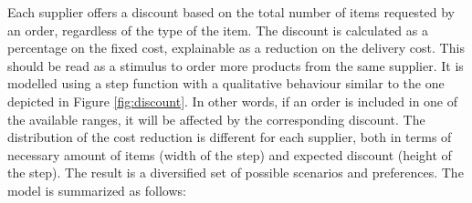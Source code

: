 \documentclass{article}
\begin{document}
Each supplier offers a discount based on the total number of items requested by an order, regardless of the type of the item. The discount is calculated as a percentage on the fixed cost, explainable as a reduction on the delivery cost. This should be read as a stimulus to order more products from the same supplier. It is modelled using a step function with a qualitative behaviour similar to the one depicted in Figure \ref{fig:discount}. In other words, if an order is included in one of the available ranges, it will be affected by the corresponding discount. The distribution of the cost reduction is different for each supplier, both in terms of necessary amount of items (width of the step) and expected discount (height of the step). The result is a diversified set of possible scenarios and preferences.
The model is summarized as follows:
\end{document}
